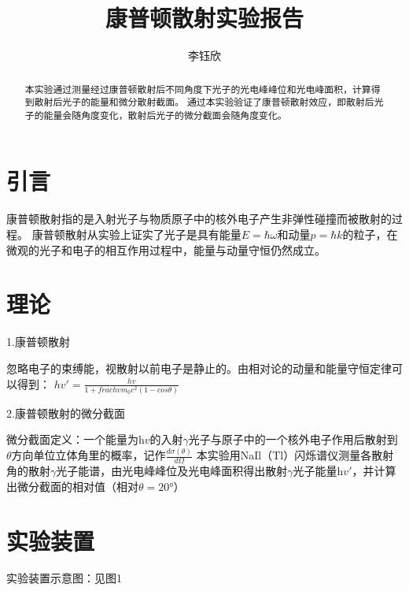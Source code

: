 \documentclass[font=default]{mpltx}
\makeatletter
\newcommand\releasedate{%
    \href{https://github.com/CastleStar14654/PKUMpLtX/releases/tag/\mpltx@fileversion}%
        {\mpltx@filedate, \mpltx@fileversion}}
\makeatother
\begin{document}
\title{康普顿散射实验报告} %
\author{李钰欣} %
\date{}
\begin{abstract}
  本实验通过测量经过康普顿散射后不同角度下光子的光电峰峰位和光电峰面积，计算得到散射后光子的能量和微分散射截面。
  通过本实验验证了康普顿散射效应，即散射后光子的能量会随角度变化，散射后光子的微分截面会随角度变化。
\end{abstract}

\maketitle

\section{引言}

康普顿散射指的是入射光子与物质原子中的核外电子产生非弹性碰撞而被散射的过程。
康普顿散射从实验上证实了光子是具有能量$E = \hbar \omega$和动量$p = \hbar k$的粒子，在微观的光子和电子的相互作用过程中，能量与动量守恒仍然成立。

 
\section{理论}\label{sec:theory}
1.康普顿散射

忽略电子的束缚能，视散射以前电子是静止的。由相对论的动量和能量守恒定律可以得到：
$hv' = \frac{hv}{1+ frac{hv}{m_0 c^2}(1-cos \theta)}$

2.康普顿散射的微分截面

微分截面定义：一个能量为h$v$的入射$\gamma$光子与原子中的一个核外电子作用后散射到$\theta$方向单位立体角里的概率，记作$\frac{d \sigma (\theta)}{d \Omega}$
本实验用NaIl（Tl）闪烁谱仪测量各散射角的散射$\gamma$光子能谱，由光电峰峰位及光电峰面积得出散射$\gamma$光子能量h$v'$，并计算出微分截面的相对值（相对$\theta = 20$°）

\section{实验装置}
实验装置示意图：见图1
\end{document}
